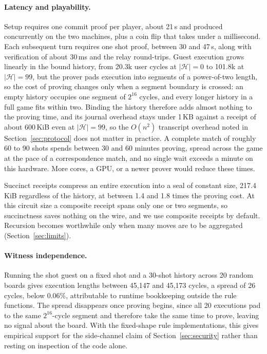 \documentclass[11pt,a4paper]{article}
\begin{document}
\paragraph{Latency and playability.} Setup requires one commit proof per
player, about 21\,s and produced concurrently on the two machines, plus a coin
flip that takes under a millisecond. Each subsequent turn requires one shot
proof, between 30 and 47\,s, along with verification of about 30\,ms and the
relay round-trips. Guest execution grows linearly in the bound history, from
20.3k user cycles at $|\mathcal{H}| = 0$ to 101.8k at $|\mathcal{H}| = 99$, but
the prover pads execution into segments of a power-of-two length, so the cost
of proving changes only when a segment boundary is crossed: an empty history
occupies one segment of $2^{16}$ cycles, and every longer history in a full
game fits within two. Binding the history therefore adds almost nothing to the
proving time, and its journal overhead stays under 1\,KB against a receipt of
about 600\,KiB even at $|\mathcal{H}| = 99$, so the $O(n^2)$ transcript overhead
noted in Section~\ref{sec:protocol} does not matter in practice. A complete
match of roughly 60 to 90 shots spends between 30 and 60 minutes proving, spread
across the game at the pace of a correspondence match, and no single wait
exceeds a minute on this hardware. More cores, a GPU, or a newer prover
\cite{zkvmcompilers} would reduce these times.

Succinct receipts compress an entire execution into a seal of constant size,
217.4\,KiB regardless of the history, at between 1.4 and 1.8 times the proving
cost. At this circuit size a composite receipt spans only one or two segments,
so succinctness saves nothing on the wire, and we use composite receipts by
default. Recursion becomes worthwhile only when many moves are to be aggregated
(Section~\ref{sec:limits}).

\paragraph{Witness independence.} Running the \textsf{shot} guest on a fixed
shot and a 30-shot history across 20 random boards gives execution lengths
between 45{,}147 and 45{,}173 cycles, a spread of 26 cycles, below 0.06\%,
attributable to runtime bookkeeping outside the rule functions. The spread
disappears once proving begins, since all 20 executions pad to the same
$2^{16}$-cycle segment and therefore take the same time to prove, leaving no
signal about the board. With the fixed-shape rule implementations, this gives
empirical support for the side-channel claim of Section~\ref{sec:security}
rather than resting on inspection of the code alone.
\end{document}
